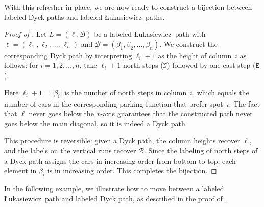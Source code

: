 \documentclass[12pt,reqno]{amsart}
\theoremstyle{definition}
\theoremstyle{remark}
\newcommand{\North}{\texttt{N}}
\newcommand{\East}{\texttt{E}}
\newcommand{\Luka}{\L ukasiewicz}
\begin{document}
With this refresher in place, we are now ready to construct a bijection between labeled Dyck paths and labeled \Luka~paths.

\begin{proof}[Proof of ] 
Let $L=(\ell,\mathcal{B})$ be a labeled \Luka~path with  
$\ell = (\ell_1,\ell_2,\ldots,\ell_n)$ and $\mathcal{B} = (\beta_1,\beta_2,\ldots,\beta_n)$.  
We construct the corresponding Dyck path by interpreting $\ell_i+1$ as the height of column~$i$ as follows: for $i=1,2,\ldots,n$, take $\ell_i+1$ north steps ($\North$) followed by one east step ($\East$).


Here $\ell_i+1 = |\beta_i|$ is the number of north steps in column~$i$,  
which equals the number of cars in the corresponding parking function that prefer spot~$i$.  
The fact that $\ell$ never goes below the $x$-axis guarantees that the constructed path  
never goes below the main diagonal, so it is indeed a Dyck path.

This procedure is reversible: given a Dyck path, the column heights recover $\ell$,  
and the labels on the vertical runs recover $\mathcal{B}$.  
Since the labeling of north steps of a Dyck path assigns the cars in increasing order from bottom to top,  each element in $\beta_i$ is in increasing order.   
This completes the bijection.
\end{proof}


In the following example, we illustrate how to move between a labeled \Luka~path and labeled Dyck path, as described in the proof of .
\end{document}
